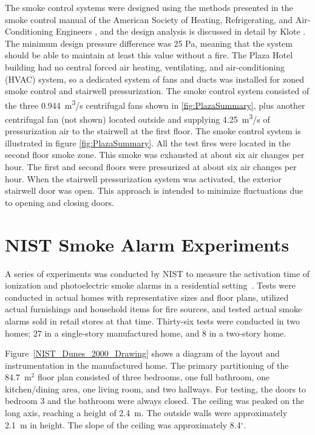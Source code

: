 The smoke control systems were designed using the methods presented in the smoke control manual of the American Society of Heating, Refrigerating, and Air-Conditioning Engineers \cite{Klote:1983}, and the design analysis is discussed in detail by Klote \cite{Klote:1988}. The minimum design pressure difference was 25 Pa, meaning that the system should be able to maintain at least this value without a fire. The Plaza Hotel building had no central forced air heating, ventilating, and air-conditioning (HVAC) system, so a dedicated system of fans and ducts was installed for zoned smoke control and stairwell pressurization. The smoke control system consisted of the three 0.944~\unit{m^3/s} centrifugal fans shown in \ref{fig:PlazaSummary}, plus another centrifugal fan (not shown) located outside and supplying 4.25~\unit{m^3/s} of pressurization air to the stairwell at the first floor. The smoke control system is illustrated in figure \ref{fig:PlazaSummary}. All the test fires were located in the second floor smoke zone. This smoke was exhausted at about six air changes per hour. The first and second floors were pressurized at about six air changes per hour. When the stairwell pressurization system was activated, the exterior stairwell door was open. This approach is intended to minimize fluctuations due to opening and closing doors.

\FloatBarrier

\section{NIST Smoke Alarm Experiments}

A series of experiments was conducted by NIST to measure the activation time of ionization and photoelectric
smoke alarms in a residential setting~\cite{Bukowski:1}. Tests were conducted in actual homes with
representative sizes and floor plans, utilized actual furnishings and household items for fire sources,
and tested actual smoke alarms sold in retail stores at that time. Thirty-six tests were conducted in two
homes; 27 in a single-story manufactured home, and 8 in a two-story home.

Figure~\ref{NIST_Dunes_2000_Drawing} shows a diagram of the layout and instrumentation in the
manufactured home. The primary partitioning of the 84.7~m$^2$ floor plan consisted of three bedrooms,
one full bathroom, one kitchen/dining area, one living room, and two hallways. For testing, the doors
to bedroom 3 and the bathroom were always closed. The ceiling
was peaked on the long axis, reaching a height of 2.4~m. The outside walls
were approximately 2.1~m in height. The slope of the ceiling was approximately 8.4$^\circ$.

